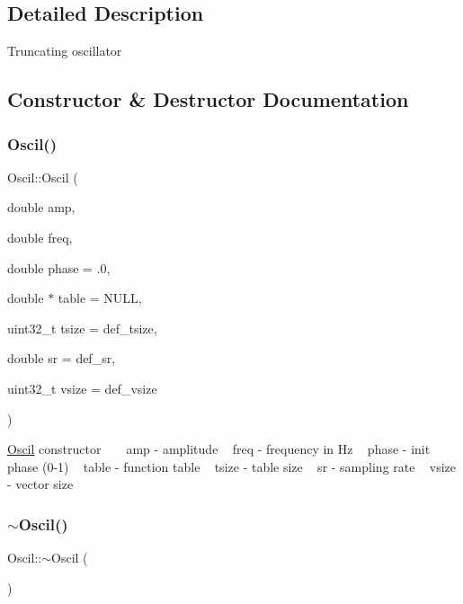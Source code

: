 \subsection{Detailed Description}
Truncating oscillator 

\subsection{Constructor \& Destructor Documentation}
\mbox{\label{class_oscil_a02ed65e22d9046e3f6253281b107b7bd}} 
\subsubsection{\texorpdfstring{Oscil()}{Oscil()}}
{\footnotesize\ttfamily Oscil\+::\+Oscil (\begin{DoxyParamCaption}\item[{double}]{amp,  }\item[{double}]{freq,  }\item[{double}]{phase = {\ttfamily .0},  }\item[{double $\ast$}]{table = {\ttfamily NULL},  }\item[{uint32\+\_\+t}]{tsize = {\ttfamily def\+\_\+tsize},  }\item[{double}]{sr = {\ttfamily def\+\_\+sr},  }\item[{uint32\+\_\+t}]{vsize = {\ttfamily def\+\_\+vsize} }\end{DoxyParamCaption})}

\hyperlink{class_oscil}{Oscil} constructor ~\newline
~\newline
amp -\/ amplitude ~\newline
freq -\/ frequency in Hz ~\newline
phase -\/ init phase (0-\/1) ~\newline
 table -\/ function table ~\newline
tsize -\/ table size ~\newline
sr -\/ sampling rate ~\newline
vsize -\/ vector size ~\newline
\mbox{\label{class_oscil_a3c09a41fb42bce840ca1b27cf27cf4f1}} 
\subsubsection{\texorpdfstring{$\sim$\+Oscil()}{~Oscil()}}
{\footnotesize\ttfamily Oscil\+::$\sim$\+Oscil (\begin{DoxyParamCaption}{ }\end{DoxyParamCaption})\hspace{0.3cm}{\ttfamily [virtual]}}

